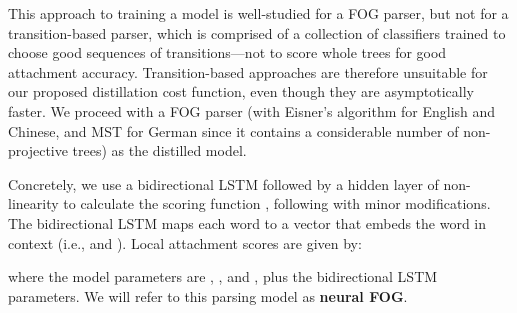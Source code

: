 \documentclass[11pt,letterpaper]{article}
\newcommand{\ignore}[1]{}
\newcommand{\cjd}[1]{\textcolor{cyan}{\ignore{{\textbf{[#1 --\textsc{cjd}]}}}}}
\newcommand{\nascomment}[1]{\ignore{\textcolor{blue}{{\textbf{[#1 --\textsc{nas}]}}}}}
\newcommand{\miguelcomment}[1]{\ignore{\textcolor{red}{{\textbf{[#1 --\textsc{miguel}]}}}}}
\begin{document}
This approach to training a model is well-studied for a FOG parser, but not for a  transition-based parser, which is comprised of a collection of classifiers trained to choose good sequences of transitions---not to score whole trees for good attachment accuracy. Transition-based approaches are therefore unsuitable for our proposed distillation cost function, even though they are asymptotically faster. \ignore{\nascomment{might want to discuss more here.}} \ignore{\miguelcomment{why do we relate to transntion-based parsers here?}}We proceed with a FOG parser (with Eisner's algorithm for English and Chinese, and MST for German since it contains a considerable number of non-projective trees)\ignore{\miguelcomment{explain why mst for german and eisner's for the rest...}} as the distilled model.

\ignore{\nascomment{I cut the citation to \newcite{label_bias}; it is not well studied for parsing and maybe better to leave out}}






\ignore{\cjd{things to do: discuss Hinton's intuitions for what kind of information is important to capture in distillation. recap it here. explain how your cost function captures this. Not all mistakes are equally as good. Second, why are we using a graph-based parsing model and why are we not using cross entropy? The answer is that we care about attachment accuracy, and we want to optimize it. Transition based models are easiest to train to maximize the probability of the sequence of actions, but we want to be able to reason about scores of different complete parses. Arc-factored models have very simple inference and directly model ``attachment'', so it's a good fit.} \nascomment{leaving Chris's comment to make sure this is done to his satisfaction}}

Concretely, we use a bidirectional LSTM followed by a hidden layer of non-linearity to calculate the scoring function , following  with minor modifications. 
The bidirectional LSTM maps each word  to a vector  that embeds the word in context (i.e.,  and ).  Local attachment scores are given by:

where the model parameters are , , and , plus the bidirectional LSTM parameters.
We will refer to this parsing model as \textbf{neural FOG}.
\end{document}
